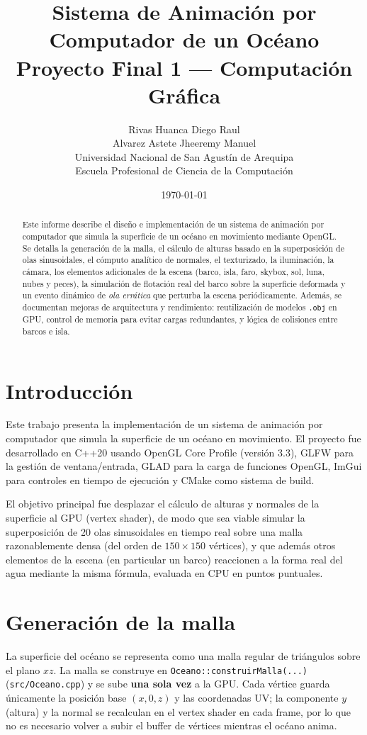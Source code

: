 \documentclass[11pt]{article}
\title{Sistema de Animación por Computador de un Océano \\ \large Proyecto Final 1 --- Computación Gráfica}
\author{Rivas Huanca Diego Raul \\ Alvarez Astete Jheeremy Manuel \\ Universidad Nacional de San Agustín de Arequipa \\ Escuela Profesional de Ciencia de la Computación}
\date{\today}
\begin{document}
\maketitle

\begin{abstract}
Este informe describe el diseño e implementación de un sistema de animación
por computador que simula la superficie de un océano en movimiento mediante
OpenGL. Se detalla la generación de la malla, el cálculo de alturas basado en
la superposición de olas sinusoidales, el cómputo analítico de normales, el
texturizado, la iluminación, la cámara, los elementos adicionales de la
escena (barco, isla, faro, skybox, sol, luna, nubes y peces), la simulación de flotación real del
barco sobre la superficie deformada y un evento dinámico de \emph{ola
errática} que perturba la escena periódicamente. Además, se documentan mejoras
de arquitectura y rendimiento: reutilización de modelos \texttt{.obj} en GPU,
control de memoria para evitar cargas redundantes, y lógica de colisiones
entre barcos e isla.
\end{abstract}

\tableofcontents
\newpage

\section{Introducción}
Este trabajo presenta la implementación de un sistema de animación por
computador que simula la superficie de un océano en movimiento. El proyecto
fue desarrollado en C++20 usando OpenGL Core Profile (versión 3.3), GLFW
para la gestión de ventana/entrada, GLAD para la carga de funciones OpenGL,
ImGui para controles en tiempo de ejecución y CMake como sistema de build.

El objetivo principal fue desplazar el cálculo de alturas y normales de la
superficie al GPU (vertex shader), de modo que sea viable simular la
superposición de 20 olas sinusoidales en tiempo real sobre una malla
razonablemente densa (del orden de $150\times150$ vértices), y que además
otros elementos de la escena (en particular un barco) reaccionen a la forma
real del agua mediante la misma fórmula, evaluada en CPU en puntos
puntuales.

\section{Generación de la malla}
La superficie del océano se representa como una malla regular de triángulos
sobre el plano $xz$. La malla se construye en \texttt{Oceano::construirMalla(...)}
(\texttt{src/Oceano.cpp}) y se sube \textbf{una sola vez} a la GPU. Cada
vértice guarda únicamente la posición base $(x,0,z)$ y las coordenadas UV;
la componente $y$ (altura) y la normal se recalculan en el vertex shader en
cada frame, por lo que no es necesario volver a subir el buffer de vértices
mientras el océano anima.
\end{document}
